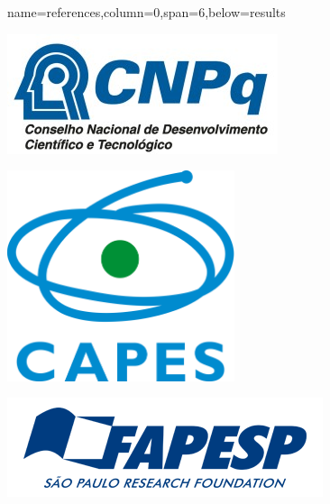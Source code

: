 \documentclass[a0paper,portrait]{baposter}
\begin{document}
\begin{poster}
 {name=references,column=0,span=6,below=results}{
\begin{minipage}{0.725\textwidth}
\renewcommand{\section}[2]{\vskip 0.0em} %

\nocite{*}

{\footnotesize
} %
\end{minipage}
\hfill
\begin{minipage}{0.275\textwidth}
\begin{center}
  \begin{minipage}{0.3\textwidth}
    \centering\includegraphics[width=\textwidth]{cnpq.jpg}
  \end{minipage}
  \begin{minipage}{0.3\textwidth}
    \centering\includegraphics[width=0.5\textwidth]{capes_logo.png}
  \end{minipage}
  \begin{minipage}{0.3\textwidth}
    \centering\includegraphics[width=\textwidth]{fapesp.png}
  \end{minipage}
\end{center}
\end{minipage}
}

\end{poster}
\end{document}
